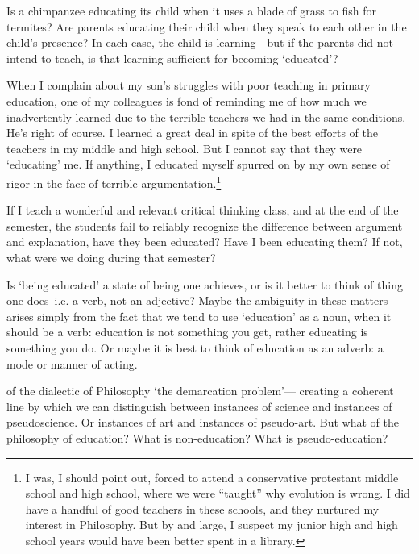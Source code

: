 Is a chimpanzee educating its child when it uses a blade of grass to fish for termites? Are parents educating their child when they speak to each other in the child's presence? In each case, the child is learning---but if the parents did not intend to teach, is that learning sufficient for becoming `educated'? 

When I complain about my son's struggles with poor teaching in primary education, one of my colleagues is fond of reminding me of how much we inadvertently learned due to the terrible teachers we had in the same conditions. He's right of course. I learned a great deal in spite of the best efforts of the teachers in my middle and high school. But I cannot say that they were `educating' me. If anything, I educated myself spurred on by my own sense of rigor in the face of terrible argumentation.\footnote{I was, I should point out, forced to attend a conservative protestant middle school and high school, where we were ``taught'' why evolution is wrong. I did have a handful of good teachers in these schools, and they nurtured my interest in Philosophy. But by and large, I suspect my junior high and high school years would have been better spent in a library.}

If I teach a wonderful and relevant critical thinking class, and at the end of the semester, the students fail to reliably recognize the difference between argument and explanation, have they been educated? Have I been educating them? If not, what were we doing during that semester?

Is `being educated' a state of being one achieves, or is it better to think of thing one does--i.e. a verb, not an adjective? Maybe the ambiguity in these matters arises simply from the fact that we tend to use `education' as a noun, when it should be a verb: education is not something you get, rather educating is something you do. Or maybe it is best to think of education as an adverb: a mode or manner of acting.

 of the dialectic of Philosophy `the demarcation problem'--- creating a coherent line by which we can distinguish between instances of science and instances of pseudoscience. Or instances of art and instances of pseudo-art. But what of the philosophy of education? What is non-education? What is pseudo-education?

